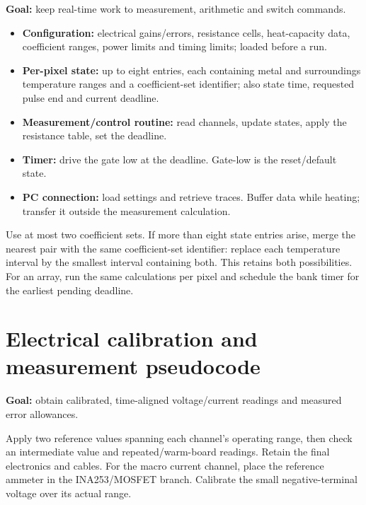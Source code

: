 \documentclass[11pt,letterpaper]{article}
\begin{document}
\textbf{Goal:} keep real-time work to measurement, arithmetic and switch commands.

\begin{itemize}
\item \textbf{Configuration:} electrical gains/errors, resistance cells, heat-capacity data, coefficient ranges, power limits and timing limits; loaded before a run.
\item \textbf{Per-pixel state:} up to eight entries, each containing metal and surroundings temperature ranges and a coefficient-set identifier; also state time, requested pulse end and current deadline.
\item \textbf{Measurement/control routine:} read channels, update states, apply the resistance table, set the deadline.
\item \textbf{Timer:} drive the gate low at the deadline. Gate-low is the reset/default state.
\item \textbf{PC connection:} load settings and retrieve traces. Buffer data while heating; transfer it outside the measurement calculation.
\end{itemize}

Use at most two coefficient sets. If more than eight state entries arise, merge the nearest pair with the same coefficient-set identifier: replace each temperature interval by the smallest interval containing both. This retains both possibilities. For an array, run the same calculations per pixel and schedule the bank timer for the earliest pending deadline.

\appendix
{}
\section{Electrical calibration and measurement pseudocode}

\textbf{Goal:} obtain calibrated, time-aligned voltage/current readings and measured error allowances.

Apply two reference values spanning each channel's operating range, then check an intermediate value and repeated/warm-board readings. Retain the final electronics and cables. For the macro current channel, place the reference ammeter in the INA253/MOSFET branch. Calibrate the small negative-terminal voltage over its actual range.
\end{document}
